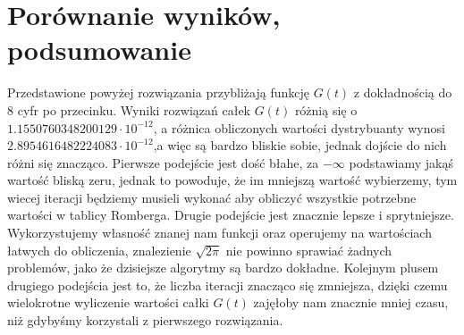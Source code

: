 \documentclass[a4paper,12pt]{article}
\begin{document}
\newpage
\section{Porównanie wyników, podsumowanie}
Przedstawione powyżej rozwiązania przybliżają funkcję $G(t)$ z dokładnością
do 8 cyfr po przecinku. Wyniki rozwiązań całek $G(t)$ różnią się o 
$1.1550760348200129 \cdot 10^{-12}$, a różnica obliczonych wartości dystrybuanty
wynosi $2.8954616482224083 \cdot 10^{-12}$,a więc są bardzo bliskie sobie, jednak
dojście do nich różni się znacząco. Pierwsze podejście jest dość błahe,
za $-\infty$ podstawiamy jakąś wartość bliską zeru, jednak to powoduje, że
im mniejszą wartość wybierzemy, tym wiecej iteracji będziemy musieli wykonać
aby obliczyć wszystkie potrzebne wartości w tablicy Romberga. Drugie podejście
jest znacznie lepsze i sprytniejsze. Wykorzystujemy własność znanej nam funkcji
oraz operujemy na wartościach łatwych do obliczenia, znalezienie $\sqrt{2\pi}$ 
nie powinno sprawiać żadnych problemów, jako że dzisiejsze algorytmy są bardzo 
dokładne. Kolejnym plusem drugiego podejścia jest to, że liczba iteracji
znacząco się zmniejsza, dzięki czemu wielokrotne wyliczenie wartości całki 
$G(t)$ zajęłoby nam znacznie mniej czasu, niż gdybyśmy korzystali z pierwszego
rozwiązania.
\end{document}
